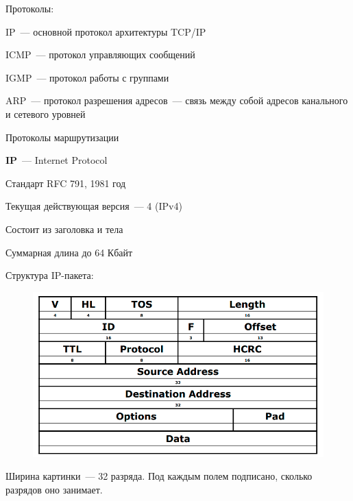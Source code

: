 
Протоколы:
\begin{MyItemize}
    \item IP~--- основной протокол архитектуры TCP/IP
    \item ICMP~--- протокол управляющих сообщений
    \item IGMP~--- протокол работы с группами
    \item ARP~--- протокол разрешения адресов~--- связь между собой адресов канального и сетевого уровней
    \item Протоколы маршрутизации
\end{MyItemize}


{\bf IP}~--- Internet Protocol

Стандарт RFC 791, 1981 год

Текущая действующая версия~--- 4 (IPv4)

Состоит из заголовка и тела

Суммарная длина до 64 Кбайт

Структура IP-пакета:

\begin{figure}[H]
  \centering
  \includegraphics[width=15cm]{images/02/01}
\end{figure}

Ширина картинки~--- 32 разряда. Под каждым полем подписано, сколько разрядов оно занимает.

